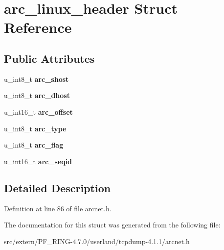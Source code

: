 \hypertarget{structarc__linux__header}{
\section{arc\_\-linux\_\-header Struct Reference}
\label{structarc__linux__header}
}
\subsection*{Public Attributes}
\begin{DoxyCompactItemize}
\item 
\hypertarget{structarc__linux__header_a28e17339838e3d344e2aff975ca3a730}{
u\_\-int8\_\-t {\bfseries arc\_\-shost}}
\label{structarc__linux__header_a28e17339838e3d344e2aff975ca3a730}

\item 
\hypertarget{structarc__linux__header_ac1abe07d8804e4118b0350c94eb8b7f8}{
u\_\-int8\_\-t {\bfseries arc\_\-dhost}}
\label{structarc__linux__header_ac1abe07d8804e4118b0350c94eb8b7f8}

\item 
\hypertarget{structarc__linux__header_a21c93649b0d44de60d099c4cd9939d22}{
u\_\-int16\_\-t {\bfseries arc\_\-offset}}
\label{structarc__linux__header_a21c93649b0d44de60d099c4cd9939d22}

\item 
\hypertarget{structarc__linux__header_a9b2005d27f6d0435da54b848806146a9}{
u\_\-int8\_\-t {\bfseries arc\_\-type}}
\label{structarc__linux__header_a9b2005d27f6d0435da54b848806146a9}

\item 
\hypertarget{structarc__linux__header_abaaeb45b6461699c793a8b59f2145a1a}{
u\_\-int8\_\-t {\bfseries arc\_\-flag}}
\label{structarc__linux__header_abaaeb45b6461699c793a8b59f2145a1a}

\item 
\hypertarget{structarc__linux__header_a6e169d15122a371428602271284edf4b}{
u\_\-int16\_\-t {\bfseries arc\_\-seqid}}
\label{structarc__linux__header_a6e169d15122a371428602271284edf4b}

\end{DoxyCompactItemize}


\subsection{Detailed Description}


Definition at line 86 of file arcnet.h.



The documentation for this struct was generated from the following file:\begin{DoxyCompactItemize}
\item 
src/extern/PF\_\-RING-\/4.7.0/userland/tcpdump-\/4.1.1/arcnet.h\end{DoxyCompactItemize}

